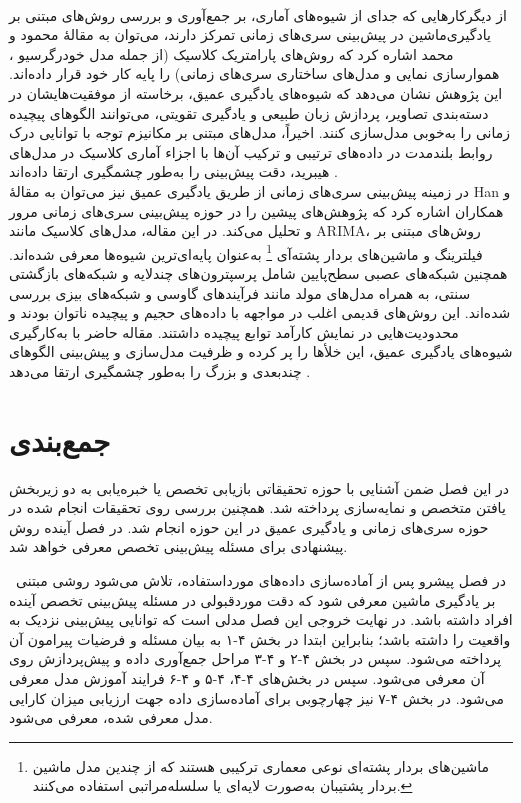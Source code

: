 \\
از دیگر‌کار‌هایی که جدای از شیوه‌های آماری، بر جمع‌آوری و بررسی روش‌های مبتنی بر یادگیری‌ماشین در پیش‌بینی سری‌های زمانی تمرکز دارند، می‌توان به مقالۀ محمود و محمد  اشاره کرد که روش‌های پارامتریک کلاسیک (از جمله مدل خودرگرسیو ، هموارسازی نمایی و مدل‌های ساختاری سری‌های زمانی) را پایه کار خود قرار داده‌اند. این پژوهش نشان می‌دهد که شیوه‌های یادگیری عمیق، برخاسته از موفقیت‌هایشان در دسته‌بندی تصاویر، پردازش زبان طبیعی و یادگیری تقویتی، می‌توانند الگوهای پیچیده زمانی را به‌خوبی مدل‌سازی کنند. اخیراً، مدل‌های مبتنی بر مکانیزم توجه با توانایی درک روابط بلندمدت در داده‌های ترتیبی و ترکیب آن‌ها با اجزاء آماری کلاسیک در مدل‌های هیبرید، دقت پیش‌بینی را به‌طور چشمگیری ارتقا داده‌اند \cite{mahmoud_survey_2020}. 
\\
در زمینه پیش‌بینی سری‌های زمانی از طریق یادگیری عمیق نیز می‌توان به مقالۀ  Han و همکاران اشاره کرد که پژوهش‌های پیشین را در حوزه پیش‌بینی سری‌های زمانی مرور و تحلیل می‌کند. در این مقاله، مدل‌های کلاسیک مانند ARIMA، روش‌های مبتنی بر فیلترینگ و ماشین‌های بردار پشته‌آی 
\footnote{ماشین‌های بردار پشته‌ای  نوعی معماری ترکیبی هستند که از چندین مدل ماشین بردار پشتیبان به‌صورت لایه‌ای یا سلسله‌مراتبی استفاده می‌کنند.}
به‌عنوان پایه‌ای‌ترین شیوه‌ها معرفی شده‌اند. همچنین شبکه‌های عصبی سطح‌پایین شامل پرسپترون‌های چند‌لایه  و شبکه‌های بازگشتی سنتی، به همراه مدل‌های مولد مانند فرآیندهای گاوسی و شبکه‌های بیزی بررسی شده‌اند. این روش‌های قدیمی اغلب در مواجهه با داده‌های حجیم و پیچیده ناتوان بودند و محدودیت‌هایی در نمایش کارآمد توابع پیچیده داشتند. مقاله حاضر با به‌کارگیری شیوه‌های یادگیری عمیق، این خلأها را پر کرده و ظرفیت مدل‌سازی و پیش‌بینی الگوهای چندبعدی و بزرگ را به‌طور چشمگیری ارتقا می‌دهد \cite{han_review_2019}.

\section{جمع‌بندی}

در این فصل ضمن آشنایی با حوزه تحقیقاتی بازیابی تخصص یا خبره‌یابی به دو زیربخش یافتن متخصص و نمایه‌سازی پرداخته شد. همچنین بررسی روی تحقیقات انجام شده در حوزه سری‌های زمانی و یادگیری عمیق در این حوزه انجام شد. در فصل آینده روش‌ پیشنهادی برای مسئله پیش‌بینی تخصص معرفی خواهد شد.

 در فصل پیشرو پس از آماده‌سازی داده‌های مورداستفاده، تلاش می‌شود روشی مبتنی بر یادگیری ماشین معرفی شود که دقت موردقبولی در مسئله پیش‌بینی تخصص آینده افراد داشته باشد. در نهایت خروجی این فصل مدلی است که توانایی پیش‌بینی نزدیک به واقعیت را داشته باشد؛ بنابراین ابتدا در بخش ۴-۱ به بیان مسئله و فرضیات پیرامون آن پرداخته می‌شود. سپس در بخش ۴-۲ و ۴-۳ مراحل جمع‌آوری داده و پیش‌پردازش روی آن معرفی می‌شود. سپس در بخش‌های ۴-۴، ۴-۵ و ۴-۶ فرایند آموزش مدل معرفی می‌شود. در بخش ۴-۷ نیز چهارچوبی برای آماده‌سازی داده جهت ارزیابی میزان کارایی مدل معرفی شده، معرفی می‌شود.

